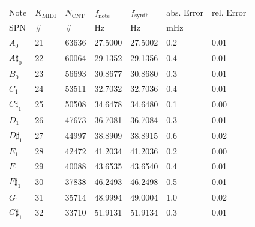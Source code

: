 \begin{tabularx}{\textwidth}{YYYYYYY}
	\toprule
	Note          & $K_\text{MIDI}$ & $N_\text{CNT}$ & $f_\text{note}$ & $f_\text{synth}$ & abs. Error        & rel. Error   \\
	\acs{SPN}     & \#              & \#             & \si{\hertz}     & \si{\hertz}      & \si{\milli\hertz} & \si{\permil} \\ \midrule
	$A_{0}$       & 21              & 63636          & 27.5000         & 27.5002          & 0.2               & 0.01         \\
	$A\sharp_{0}$ & 22              & 60064          & 29.1352         & 29.1356          & 0.4               & 0.01         \\
	$B_{0}$       & 23              & 56693          & 30.8677         & 30.8680          & 0.3               & 0.01         \\
	$C_{1}$       & 24              & 53511          & 32.7032         & 32.7036          & 0.4               & 0.01         \\
	$C\sharp_{1}$ & 25              & 50508          & 34.6478         & 34.6480          & 0.1               & 0.00         \\
	$D_{1}$       & 26              & 47673          & 36.7081         & 36.7084          & 0.3               & 0.01         \\
	$D\sharp_{1}$ & 27              & 44997          & 38.8909         & 38.8915          & 0.6               & 0.02         \\
	$E_{1}$       & 28              & 42472          & 41.2034         & 41.2036          & 0.2               & 0.00         \\
	$F_{1}$       & 29              & 40088          & 43.6535         & 43.6540          & 0.4               & 0.01         \\
	$F\sharp_{1}$ & 30              & 37838          & 46.2493         & 46.2498          & 0.5               & 0.01         \\
	$G_{1}$       & 31              & 35714          & 48.9994         & 49.0004          & 1.0               & 0.02         \\
	$G\sharp_{1}$ & 32              & 33710          & 51.9131         & 51.9134          & 0.3               & 0.01         \\
	\bottomrule
\end{tabularx}
